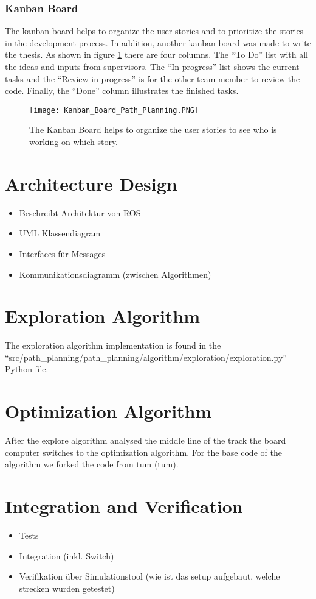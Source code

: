 \subsubsection{Kanban Board} \label{sec:Kanban Board}
The kanban board helps to organize the user stories and to prioritize the stories in the development process. In addition, another kanban board was made to write the thesis. As shown in figure \ref{fig:Kanban Board Path Planning} there are four columns. The ``To Do'' list with all the ideas and inputs from supervisors. The ``In progress'' list shows the current tasks and the ``Review in progress'' is for the other team member to review the code. Finally, the ``Done'' column illustrates the finished tasks.
\begin{figure}[H]
    \centering
    \texttt{[image: Kanban\_Board\_Path\_Planning.PNG]}
    \caption{The Kanban Board helps to organize the user stories to see who is working on which story.}
    \label{fig:Kanban Board Path Planning}
\end{figure}


\section{Architecture Design} \label{sec:Architecture Design}
\begin{itemize}
    \item Beschreibt Architektur von ROS
    \item UML Klassendiagram
    \item Interfaces für Messages
    \item Kommunikationsdiagramm (zwischen Algorithmen)
\end{itemize}

\section{Exploration Algorithm} \label{sec:Exploration Algorithm}
The exploration algorithm implementation is found in the ``src/path\_planning/path\_planning/algorithm/exploration/exploration.py'' Python file. 

\section{Optimization Algorithm} \label{sec:Optimization Algorithm}
After the explore algorithm analysed the middle line of the track the board computer switches to the optimization algorithm. For the base code of the algorithm we forked the code from \acrlong{tum} (\acrshort{tum}). \cite{tumftm_optimization_algoritm} 



\section{Integration and Verification}

\begin{itemize}
    \item Tests
    \item Integration (inkl. Switch)
    \item Verifikation über Simulationstool (wie ist das setup aufgebaut, welche strecken wurden getestet)
\end{itemize}